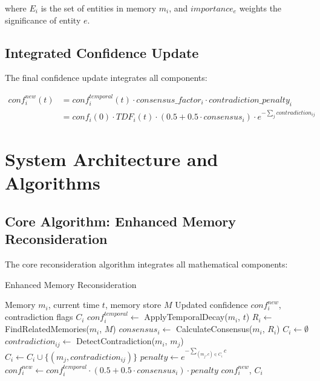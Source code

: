 \documentclass[12pt,a4paper]{article}
\begin{document}
where $E_i$ is the set of entities in memory $m_i$, and $importance_e$ weights the significance of entity $e$.

\subsection{Integrated Confidence Update}

The final confidence update integrates all components:

\begin{equation}
\begin{aligned}
conf_i^{new}(t) &= conf_i^{temporal}(t) \cdot consensus\_factor_i \cdot contradiction\_penalty_i \\
&= conf_i(0) \cdot TDF_i(t) \cdot (0.5 + 0.5 \cdot consensus_i) \cdot e^{-\sum_j contradiction_{ij}}
\end{aligned}
\end{equation}

\section{System Architecture and Algorithms}

\subsection{Core Algorithm: Enhanced Memory Reconsideration}

The core reconsideration algorithm integrates all mathematical components:

\begin{algorithm}
\caption{Enhanced Memory Reconsideration}
\begin{algorithmic}[1]
\REQUIRE Memory $m_i$, current time $t$, memory store $M$
\ENSURE Updated confidence $conf_i^{new}$, contradiction flags $C_i$
\STATE $conf_i^{temporal} \leftarrow$ ApplyTemporalDecay($m_i$, $t$)
\STATE $R_i \leftarrow$ FindRelatedMemories($m_i$, $M$)
\STATE $consensus_i \leftarrow$ CalculateConsensus($m_i$, $R_i$)
\STATE $C_i \leftarrow \emptyset$
    \STATE $contradiction_{ij} \leftarrow$ DetectContradiction($m_i$, $m_j$)
        \STATE $C_i \leftarrow C_i \cup \{(m_j, contradiction_{ij})\}$
    \ENDIF
\ENDFOR
\STATE $penalty \leftarrow e^{-\sum_{(m_j, c) \in C_i} c}$
\STATE $conf_i^{new} \leftarrow conf_i^{temporal} \cdot (0.5 + 0.5 \cdot consensus_i) \cdot penalty$
\RETURN $conf_i^{new}$, $C_i$
\end{algorithmic}
\end{algorithm}
\end{document}
